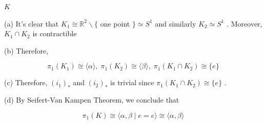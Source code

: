 \(K\)

(a) It’s clear that \({K}_{1} \cong  {\mathbb{R}}^{2} \smallsetminus  \{\) one point \(\}  \simeq  {S}^{1}\) and similarly \({K}_{2} \simeq  {S}^{1}\) . Moreover, \({K}_{1} \cap  {K}_{2}\) is contractible

(b) Therefore,

\[
{\pi }_{1}\left( {K}_{1}\right)  \cong  \langle \alpha \rangle ,\;{\pi }_{1}\left( {K}_{2}\right)  \cong  \langle \beta \rangle ,\;{\pi }_{1}\left( {{K}_{1} \cap  {K}_{2}}\right)  \cong  \{ e\}
\]

(c) Therefore, \({\left( {i}_{1}\right) }_{ * }\) and \({\left( {i}_{2}\right) }_{ * }\) is trivial since \({\pi }_{1}\left( {{K}_{1} \cap  {K}_{2}}\right)  \cong  \{ e\}\) .

(d) By Seifert-Van Kampen Theorem, we conclude that

\[
{\pi }_{1}\left( K\right)  \cong  \langle \alpha ,\beta  \mid  e = e\rangle  \cong  \langle \alpha ,\beta \rangle
\]